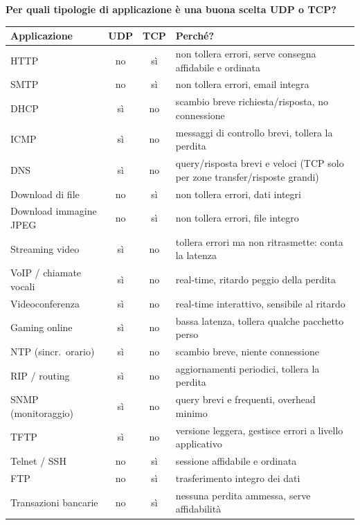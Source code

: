 \documentclass[11pt,a4paper]{report}
\begin{document}
\begin{minipage}{\textwidth}
\textbf{Per quali tipologie di applicazione \`e una buona scelta UDP o TCP?}\\[4pt]
\renewcommand{\arraystretch}{1.3}
\begin{tabular}{l c c >{\raggedright\arraybackslash}p{6.5cm}}
\hline
\textbf{Applicazione} & \textbf{UDP} & \textbf{TCP} & \textbf{Perch\'e?} \\
\hline
HTTP                    & no  & \cellcolor{yellow}s\`i & non tollera errori, serve consegna affidabile e ordinata \\
SMTP                    & no  & \cellcolor{yellow}s\`i & non tollera errori, email integra \\
DHCP                    & \cellcolor{yellow}s\`i & no & scambio breve richiesta/risposta, no connessione \\
ICMP                    & \cellcolor{yellow}s\`i & no & messaggi di controllo brevi, tollera la perdita \\
DNS                     & \cellcolor{yellow}s\`i & no & query/risposta brevi e veloci (TCP solo per zone transfer/risposte grandi) \\
Download di file        & no  & \cellcolor{yellow}s\`i & non tollera errori, dati integri \\
Download immagine JPEG  & no  & \cellcolor{yellow}s\`i & non tollera errori, file integro \\
Streaming video         & \cellcolor{yellow}s\`i & no & tollera errori ma non ritrasmette: conta la latenza \\
VoIP / chiamate vocali  & \cellcolor{yellow}s\`i & no & real-time, ritardo peggio della perdita \\
Videoconferenza         & \cellcolor{yellow}s\`i & no & real-time interattivo, sensibile al ritardo \\
Gaming online           & \cellcolor{yellow}s\`i & no & bassa latenza, tollera qualche pacchetto perso \\
NTP (sincr.\ orario)    & \cellcolor{yellow}s\`i & no & scambio breve, niente connessione \\
RIP / routing           & \cellcolor{yellow}s\`i & no & aggiornamenti periodici, tollera la perdita \\
SNMP (monitoraggio)     & \cellcolor{yellow}s\`i & no & query brevi e frequenti, overhead minimo \\
TFTP                    & \cellcolor{yellow}s\`i & no & versione leggera, gestisce errori a livello applicativo \\
Telnet / SSH            & no  & \cellcolor{yellow}s\`i & sessione affidabile e ordinata \\
FTP                     & no  & \cellcolor{yellow}s\`i & trasferimento integro dei dati \\
Transazioni bancarie    & no  & \cellcolor{yellow}s\`i & nessuna perdita ammessa, serve affidabilit\`a \\
\hline
\end{tabular}
\end{minipage}
 
\end{document}
